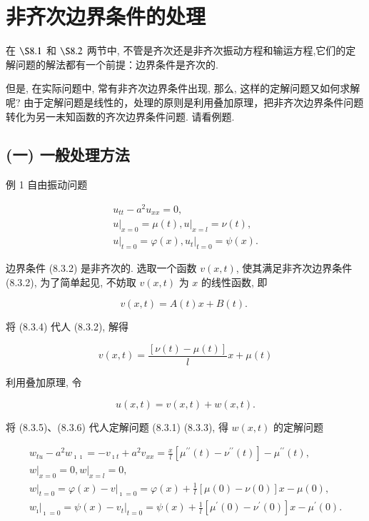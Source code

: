 \section{非齐次边界条件的处理}
\label{eq:inhomo_boundary}

在 $\S 8.1$ 和 $\S 8.2$ 两节中, 不管是齐次还是非齐次振动方程和输运方程,它们的定解问题的解法都有一个前提：边界条件是齐次的.

但是, 在实际问题中, 常有非齐次边界条件出现, 那么, 这样的定解问题又如何求解呢? 由于定解问题是线性的，处理的原则是利用叠加原理，把非齐次边界条件问题转化为另一未知函数的齐次边界条件问题. 请看例题.

\subsection{(一) 一般处理方法}
例 1 自由振动问题

$$
\begin{gathered}
u_{t t}-a^{2} u_{x x}=0, \\
\left.u\right|_{x=0}=\mu(t),\left.u\right|_{x=l}=\nu(t), \\
\left.u\right|_{t=0}=\varphi(x),\left.u_{t}\right|_{t=0}=\psi(x) .
\end{gathered}
$$

边界条件 (8.3.2) 是非齐次的.
选取一个函数 $v(x, t)$, 使其满足非齐次边界条件 (8.3.2), 为了简单起见, 不妨取 $v(x, t)$ 为 $x$ 的线性函数, 即

$$
v(x, t)=A(t) x+B(t) \text {. }
$$

将 (8.3.4) 代人 (8.3.2), 解得

$$
v(x, t)=\frac{[\nu(t)-\mu(t)]}{l} x+\mu(t)
$$

利用叠加原理, 令

$$
u(x, t)=v(x, t)+w(x, t) .
$$

将 (8.3.5)、(8.3.6) 代人定解问题 (8.3.1) (8.3.3), 得 $w(x, t)$ 的定解问题

$$
\begin{gathered}
w_{t u}-a^{2} w_{\imath \imath}=-v_{\imath t}+a^{2} v_{x x}=\frac{x}{l}\left[\mu^{\prime \prime}(t)-\nu^{\prime \prime}(t)\right]-\mu^{\prime \prime}(t), \\
\left.w\right|_{x=0}=0,\left.w\right|_{x=l}=0, \\
\left.w\right|_{t=0}=\varphi(x)-\left.v\right|_{\imath=0}=\varphi(x)+\frac{1}{l}[\mu(0)-\nu(0)] x-\mu(0), \\
\left.w_{\imath}\right|_{\imath=0}=\psi(x)-\left.v_{t}\right|_{t=0}=\psi(x)+\frac{1}{l}\left[\mu^{\prime}(0)-\nu^{\prime}(0)\right] x-\mu^{\prime}(0) .
\end{gathered}
$$

